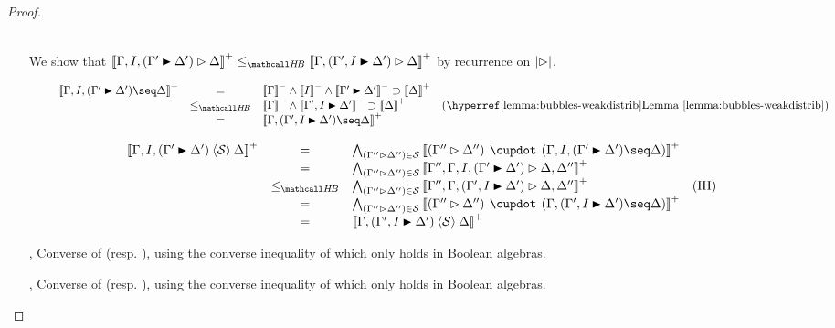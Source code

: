 \begin{proof}
\begin{itemize}
\begin{itemize}
$$\begin{array}{rcll}
      \end{array}
      $$
    \end{itemize}
    \item[{\rsf{f{-}{-}{\ua}}}]
    We show that $\psint{\Gamma, I, (\Gamma' \JB \Delta') \J \Delta} \sementHB
    \psint{\Gamma, (\Gamma', I \JB \Delta') \J \Delta}$ by recurrence on
    $\left|\mathbin{\rhd}\right|$.
    \begin{itemize}
      \item[\bcase]
      $$
      \begin{array}{rcll}
        \psint{\Gamma, I, (\Gamma' \JB \Delta') \seq \Delta}
        &=& \nsint{\Gamma} \land \nsint{I} \land \nsint{\Gamma' \JB \Delta'} \limp \psint{\Delta} & \\
        &\sementHB& \nsint{\Gamma} \land \nsint{\Gamma', I \JB \Delta'} \limp \psint{\Delta} &\text{(\reflemma{bubbles-weakdistrib})} \\
        &=& \psint{\Gamma, (\Gamma', I \JB \Delta') \seq \Delta} & \\
      \end{array}
      $$
      \item[\rcase]
      $$
      \begin{array}{rcll}
        \psint{\Gamma, I, (\Gamma' \JB \Delta') \piq{\cS} \Delta}
        &=& \psintAndMix{(\Gamma'' \J \Delta'')}{\cS}{\Gamma, I, (\Gamma' \JB \Delta')}{\Delta} & \\
        &=& \psintAnd{(\Gamma'' \J \Delta'')}{\cS}{\Gamma'', \Gamma, I, (\Gamma' \JB \Delta') \J \Delta, \Delta''} & \\
        &\sementHB& \psintAnd{(\Gamma'' \J \Delta'')}{\cS}{\Gamma'', \Gamma, (\Gamma', I \JB \Delta') \J \Delta, \Delta''} &\text{(IH)} \\
        &=& \psintAndMix{(\Gamma'' \J \Delta'')}{\cS}{\Gamma, (\Gamma', I \JB \Delta')}{\Delta} & \\
        &=& \psint{\Gamma, (\Gamma', I \JB \Delta') \piq{\cS} \Delta} & \\
      \end{array}
      $$
    \end{itemize}

    \item[{\rsf{f{-}{+}{\ua}}}, {\rsf{f{+}{-}{\ua}}}] Converse of
    {} (resp. {}), using
    the converse inequality of  which only holds in
    Boolean algebras.

    \item[{\rsf{f{+}{+}{\da}}}, {\rsf{f{-}{-}{\da}}}] Converse
    of {} (resp. {}), using
    the converse inequality of  which only holds
    in Boolean algebras.


\end{itemize}
\end{proof}
